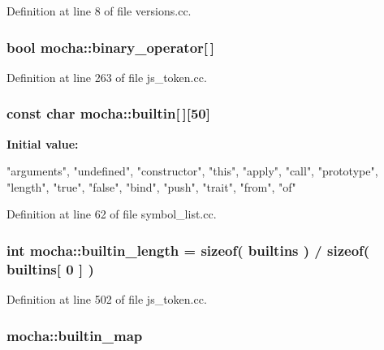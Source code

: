 Definition at line 8 of file versions.cc.

\hypertarget{namespacemocha_a944f298a899880ad69a3a3ebcbbd8d5e}{
\subsubsection[{binary\_\-operator}]{\setlength{\rightskip}{0pt plus 5cm}bool {\bf mocha::binary\_\-operator}\mbox{[}$\,$\mbox{]}}}
\label{namespacemocha_a944f298a899880ad69a3a3ebcbbd8d5e}


Definition at line 263 of file js\_\-token.cc.

\hypertarget{namespacemocha_ab9af324926667c55b1daeaa0e79aaacb}{
\subsubsection[{builtin}]{\setlength{\rightskip}{0pt plus 5cm}const char {\bf mocha::builtin}\mbox{[}$\,$\mbox{]}\mbox{[}50\mbox{]}}}
\label{namespacemocha_ab9af324926667c55b1daeaa0e79aaacb}
{\bfseries Initial value:}
\begin{DoxyCode}
 {
  "arguments",
  "undefined",
  "constructor",
  "this",
  "apply",
  "call",
  "prototype",
  "length",
  "true",
  "false",
  "bind",
  "push",
  "trait",
  "from",
  "of"
}
\end{DoxyCode}


Definition at line 62 of file symbol\_\-list.cc.

\hypertarget{namespacemocha_a4fdbec5bf4adee2824ef9762bd136c55}{
\subsubsection[{builtin\_\-length}]{\setlength{\rightskip}{0pt plus 5cm}int {\bf mocha::builtin\_\-length} = sizeof( {\bf builtins} ) / sizeof( {\bf builtins}\mbox{[} 0 \mbox{]} )}}
\label{namespacemocha_a4fdbec5bf4adee2824ef9762bd136c55}


Definition at line 502 of file js\_\-token.cc.

\hypertarget{namespacemocha_aaacb26925f4ce13e96d411be146383b4}{
\subsubsection[{builtin\_\-map}]{ {\bf mocha::builtin\_\-map}}}
\label{namespacemocha_aaacb26925f4ce13e96d411be146383b4}


